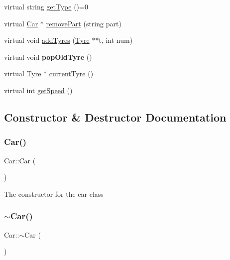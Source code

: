 \begin{DoxyCompactItemize}
\item 
virtual string \hyperlink{classCar_ae502eb1c04753317ebdb759497fd030c}{get\+Type} ()=0
\item 
virtual \hyperlink{classCar}{Car} $\ast$ \hyperlink{classCar_a54018ac7e84e79c8bfc1a8fba5e45b16}{remove\+Part} (string part)
\item 
virtual void \hyperlink{classCar_a5c5f22cb9232b88a53a4ffc324824aa1}{add\+Tyres} (\hyperlink{classTyre}{Tyre} $\ast$$\ast$t, int num)
\item 
\mbox{\label{classCar_a5859a9475be0c26341ca4f3acf23a2ea}} 
virtual void {\bfseries pop\+Old\+Tyre} ()
\item 
virtual \hyperlink{classTyre}{Tyre} $\ast$ \hyperlink{classCar_aadd6f69cf389b293a5e8a098ebc75f1d}{current\+Tyre} ()
\item 
virtual int \hyperlink{classCar_a18e48b5cf9815216b8e82351d36b8d9f}{get\+Speed} ()
\end{DoxyCompactItemize}


\subsection{Constructor \& Destructor Documentation}
\mbox{\label{classCar_a1c803f7c5038d3e31b368b0d0a35493c}} 
\subsubsection{\texorpdfstring{Car()}{Car()}}
{\footnotesize\ttfamily Car\+::\+Car (\begin{DoxyParamCaption}{ }\end{DoxyParamCaption})}

The constructor for the car class \mbox{\label{classCar_a5933bb06e96b159fe339a128abda888a}} 
\subsubsection{\texorpdfstring{$\sim$\+Car()}{~Car()}}
{\footnotesize\ttfamily Car\+::$\sim$\+Car (\begin{DoxyParamCaption}{ }\end{DoxyParamCaption})\hspace{0.3cm}{\ttfamily [virtual]}}

